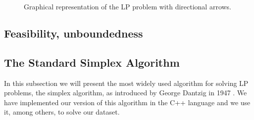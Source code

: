 \begin{figure}[h]
    \centering
    \caption{Graphical representation of the LP problem with directional arrows.}
    \label{fig:lp_problem}
\end{figure}


\subsection{Feasibility, unboundedness}\label{feasibility}

\subsection{The Standard Simplex Algorithm}
In this subsection we will present the most widely used algorithm for solving
LP problems, the simplex algorithm, as introduced by George Dantzig in 1947
\parencite{dantzig1990origins}. We have implemented our version of this algorithm
in the C++ language and we use it, among others, to solve our dataset.

